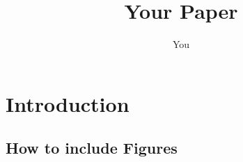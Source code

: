 \documentclass[a4paper]{article}
\title{Your Paper}
\author{You}
\begin{document}
\maketitle

\begin{abstract}
\end{abstract}

\section{Introduction}

\subsection{How to include Figures}
\end{document}
